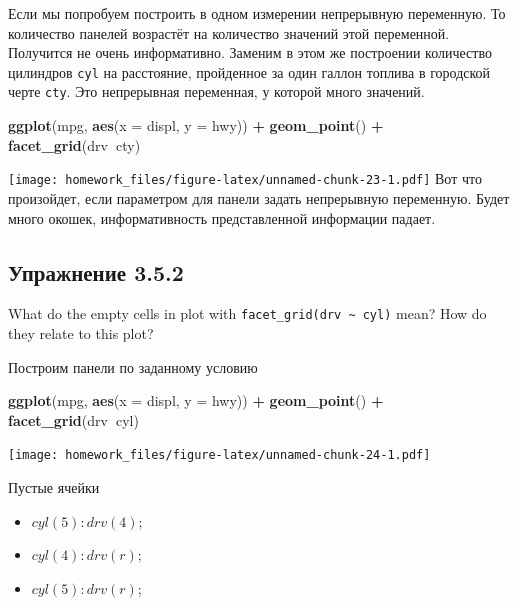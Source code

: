 \documentclass[]{book}
\newenvironment{Shaded}{\begin{snugshade}}{\end{snugshade}}
\newcommand{\KeywordTok}[1]{\textcolor[rgb]{0.13,0.29,0.53}{\textbf{#1}}}
\newcommand{\DataTypeTok}[1]{\textcolor[rgb]{0.13,0.29,0.53}{#1}}
\newcommand{\StringTok}[1]{\textcolor[rgb]{0.31,0.60,0.02}{#1}}
\newcommand{\OperatorTok}[1]{\textcolor[rgb]{0.81,0.36,0.00}{\textbf{#1}}}
\newcommand{\NormalTok}[1]{#1}
\providecommand{\tightlist}{%
  \setlength{\itemsep}{0pt}\setlength{\parskip}{0pt}}
\begin{document}
Если мы попробуем построить в одном измерении непрерывную переменную. То
количество панелей возрастёт на количество значений этой переменной.
Получится не очень информативно. Заменим в этом же построении количество
цилиндров \texttt{cyl} на расстояние, пройденное за один галлон топлива
в городской черте \texttt{cty}. Это непрерывная переменная, у которой
много значений.

\begin{Shaded}
\begin{Highlighting}[]
\KeywordTok{ggplot}\NormalTok{(mpg, }\KeywordTok{aes}\NormalTok{(}\DataTypeTok{x =}\NormalTok{ displ, }\DataTypeTok{y =}\NormalTok{ hwy)) }\OperatorTok{+}
\StringTok{ }\KeywordTok{geom_point}\NormalTok{() }\OperatorTok{+}
\StringTok{ }\KeywordTok{facet_grid}\NormalTok{(drv}\OperatorTok{~}\NormalTok{cty)}
\end{Highlighting}
\end{Shaded}

\texttt{[image: homework\_files/figure-latex/unnamed-chunk-23-1.pdf]} Вот
что произойдет, если параметром для панели задать непрерывную
переменную. Будет много окошек, информативность представленной
информации падает.

\subsection*{Упражнение 3.5.2}\label{-3.5.2}

What do the empty cells in plot with
\texttt{facet\_grid(drv\ \textasciitilde{}\ cyl)} mean? How do they
relate to this plot?

Построим панели по заданному условию

\begin{Shaded}
\begin{Highlighting}[]
\KeywordTok{ggplot}\NormalTok{(mpg, }\KeywordTok{aes}\NormalTok{(}\DataTypeTok{x =}\NormalTok{ displ, }\DataTypeTok{y =}\NormalTok{ hwy)) }\OperatorTok{+}
\StringTok{    }\KeywordTok{geom_point}\NormalTok{() }\OperatorTok{+}
\StringTok{    }\KeywordTok{facet_grid}\NormalTok{(drv}\OperatorTok{~}\NormalTok{cyl)}
\end{Highlighting}
\end{Shaded}

\texttt{[image: homework\_files/figure-latex/unnamed-chunk-24-1.pdf]}

Пустые ячейки

\begin{itemize}
\tightlist
\item
  \(cyl(5):drv(4)\);
\item
  \(cyl(4):drv(r)\);
\item
  \(cyl(5):drv(r)\);
\end{itemize}
\end{document}
